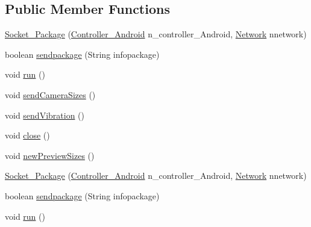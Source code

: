 \subsection*{Public Member Functions}
\begin{DoxyCompactItemize}
\item 
\hyperlink{classswp_1_1tuilmenau_1_1carduinodroid_1_1controller_1_1_socket___package_aa4bb757cfbf01a6dd21d114690131248}{Socket\+\_\+\+Package} (\hyperlink{classswp_1_1tuilmenau_1_1carduinodroid_1_1controller_1_1_controller___android}{Controller\+\_\+\+Android} n\+\_\+controller\+\_\+\+Android, \hyperlink{classswp_1_1tuilmenau_1_1carduinodroid_1_1controller_1_1_network}{Network} nnetwork)
\item 
boolean \hyperlink{classswp_1_1tuilmenau_1_1carduinodroid_1_1controller_1_1_socket___package_af1f59a4d10ed02a41fdbfbe189d51922}{sendpackage} (String infopackage)
\item 
void \hyperlink{classswp_1_1tuilmenau_1_1carduinodroid_1_1controller_1_1_socket___package_a5ac59e8b14090f0669452997e1d55a09}{run} ()
\item 
void \hyperlink{classswp_1_1tuilmenau_1_1carduinodroid_1_1controller_1_1_socket___package_a3e8a8bb73c0297f4589d74cb622689d4}{send\+Camera\+Sizes} ()
\item 
void \hyperlink{classswp_1_1tuilmenau_1_1carduinodroid_1_1controller_1_1_socket___package_ac94eadb1cae5fe5ed772c92c36ff81b6}{send\+Vibration} ()
\item 
void \hyperlink{classswp_1_1tuilmenau_1_1carduinodroid_1_1controller_1_1_socket___package_aa1379b7f52f3773259cf1c6fb08fb2a9}{close} ()
\item 
void \hyperlink{classswp_1_1tuilmenau_1_1carduinodroid_1_1controller_1_1_socket___package_a37c276fcdbfcbbe5f608531c255d3b00}{new\+Preview\+Sizes} ()
\item 
\hyperlink{classswp_1_1tuilmenau_1_1carduinodroid_1_1controller_1_1_socket___package_aa4bb757cfbf01a6dd21d114690131248}{Socket\+\_\+\+Package} (\hyperlink{classswp_1_1tuilmenau_1_1carduinodroid_1_1controller_1_1_controller___android}{Controller\+\_\+\+Android} n\+\_\+controller\+\_\+\+Android, \hyperlink{classswp_1_1tuilmenau_1_1carduinodroid_1_1controller_1_1_network}{Network} nnetwork)
\item 
boolean \hyperlink{classswp_1_1tuilmenau_1_1carduinodroid_1_1controller_1_1_socket___package_af1f59a4d10ed02a41fdbfbe189d51922}{sendpackage} (String infopackage)
\item 
void \hyperlink{classswp_1_1tuilmenau_1_1carduinodroid_1_1controller_1_1_socket___package_a5ac59e8b14090f0669452997e1d55a09}{run} ()

\end{DoxyCompactItemize}
